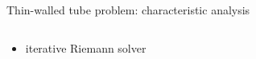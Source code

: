 \begin{frame}{Thin-walled tube problem: characteristic analysis \cite{Clifton}}
\begin{footnotesize}
\begin{columns}
\begin{column}{0.6\textwidth}
\begin{itemize}
\begin{itemize}
          \item \footnotesize iterative Riemann solver \cite{Lin_et_Ballman}
          \end{itemize}
        \end{itemize}
      \end{column}
      \begin{column}{0.43\textwidth}
        \begin{overprint}
          \vskip 5pt
          \centering
          
          \vskip 5pt
          \centering
          
          \vskip 5pt
          \centering
          
          \vskip 5pt
          \centering
          
          
        \end{overprint}
        
      \end{column}
    \end{columns}
  \end{footnotesize}
\end{frame}


